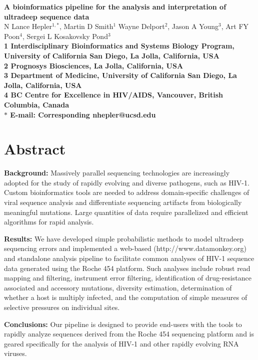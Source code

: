 \documentclass[10pt]{article}
\date{}
\begin{document}
\begin{flushleft}
{\Large
\textbf{A bioinformatics pipeline for the analysis and interpretation of ultradeep sequence data}
}
\\
N Lance Hepler$^{1,\ast}$,
Martin D Smith$^{1}$
Wayne Delport$^{2}$,
Jason A Young$^{3}$,
Art FY Poon$^{4}$,
Sergei L Kosakovsky Pond$^{3}$
\\
\bf{1} Interdisciplinary Bioinformatics and Systems Biology Program, University of California San Diego, La Jolla, California, USA
\\
\bf{2} Prognosys Biosciences, La Jolla, California, USA
\\
\bf{3} Department of Medicine, University of California San Diego, La Jolla, California, USA
\\
\bf{4} BC Centre for Excellence in HIV/AIDS, Vancouver, British Columbia, Canada
\\
$\ast$ E-mail: Corresponding nhepler@ucsd.edu
\end{flushleft}

\section*{Abstract}
\textbf{Background:} Massively parallel sequencing technologies are increasingly adopted for the study of rapidly evolving and diverse pathogens, such as HIV-1.
Custom bioinformatics tools are needed to address domain-specific challenges of viral sequence analysis
and differentiate sequencing artifacts from biologically meaningful mutations.
Large quantities of data require parallelized and efficient algorithms for rapid analysis.

\textbf{Results:} We have developed simple probabilistic methods to model ultradeep sequencing errors
and implemented a web-based (http://www.datamonkey.org)
and standalone analysis pipeline to facilitate common analyses of HIV-1 sequence data generated using the Roche 454 platform.
Such analyses include robust read mapping and filtering,
instrument error filtering,
identification of drug-resistance associated and accessory mutations,
diversity estimation,
determination of whether a host is multiply infected,
and the computation of simple measures of selective pressures on individual sites. 

\textbf{Conclusions:} Our pipeline is designed to provide end-users with the tools to rapidly analyze sequences derived
from the Roche 454 sequencing platform and is geared specifically for the analysis of HIV-1 and other rapidly evolving RNA viruses.
\end{document}
